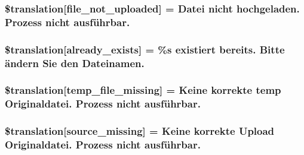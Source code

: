 \subsubsection[{\$translation}]{\setlength{\rightskip}{0pt plus 5cm}\$translation\mbox{[}\textquotesingle{}file\+\_\+not\+\_\+uploaded\textquotesingle{}\mbox{]} = \textquotesingle{}Datei nicht hochgeladen. Prozess nicht ausführbar.\textquotesingle{}}\label{class_8upload_8de___d_e_8php_a4ce76e7be0b3a03c2b47f6d70c21832e}
\hypertarget{class_8upload_8de___d_e_8php_afd84e910217f04139f567c41e292afa5}{}
\subsubsection[{\$translation}]{\setlength{\rightskip}{0pt plus 5cm}\$translation\mbox{[}\textquotesingle{}already\+\_\+exists\textquotesingle{}\mbox{]} = \textquotesingle{}\%s existiert bereits. Bitte ändern Sie den Dateinamen.\textquotesingle{}}\label{class_8upload_8de___d_e_8php_afd84e910217f04139f567c41e292afa5}
\hypertarget{class_8upload_8de___d_e_8php_ab0fa87a88aba2624004581eed0633325}{}
\subsubsection[{\$translation}]{\setlength{\rightskip}{0pt plus 5cm}\$translation\mbox{[}\textquotesingle{}temp\+\_\+file\+\_\+missing\textquotesingle{}\mbox{]} = \textquotesingle{}Keine korrekte temp Originaldatei. Prozess nicht ausführbar.\textquotesingle{}}\label{class_8upload_8de___d_e_8php_ab0fa87a88aba2624004581eed0633325}
\hypertarget{class_8upload_8de___d_e_8php_aceaaf7355acaaf10f0ae60378d03c468}{}
\subsubsection[{\$translation}]{\setlength{\rightskip}{0pt plus 5cm}\$translation\mbox{[}\textquotesingle{}source\+\_\+missing\textquotesingle{}\mbox{]} = \textquotesingle{}Keine korrekte Upload Originaldatei. Prozess nicht ausführbar.\textquotesingle{}}\label{class_8upload_8de___d_e_8php_aceaaf7355acaaf10f0ae60378d03c468}
\hypertarget{class_8upload_8de___d_e_8php_aff2427c72a2598aefa6d58df1dd18b08}{}

